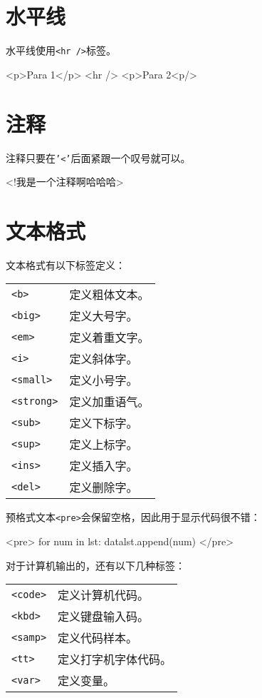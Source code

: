 \documentclass[a4paper,12pt]{report}
\newcommand{\httag}[1]{\texttt{<#1>\index{<#1>}}}
\begin{document}
\section{水平线}
水平线使用\httag{hr /}标签。
\begin{myht}
<p>Para 1</p>
<hr />
<p>Para 2<p/>
\end{myht}

\section{注释}
注释只要在\texttt{'<'}后面紧跟一个叹号就可以。
\begin{myht}
<!我是一个注释啊哈哈哈>
\end{myht}

\section{文本格式}
文本格式有以下标签定义：

\begin{center}
\begin{tabular}{ll}
\httag{b} &	定义粗体文本。\\
\httag{big} & 定义大号字。\\
\httag{em} & 定义着重文字。\\
\httag{i} &	定义斜体字。 \\
\httag{small} & 定义小号字。 \\
\httag{strong} & 定义加重语气。 \\
\httag{sub} & 定义下标字。 \\
\httag{sup} & 定义上标字。 \\
\httag{ins} & 定义插入字。 \\
\httag{del} & 定义删除字。
\end{tabular}
\end{center}

预格式文本\httag{pre}会保留空格，因此用于显示代码很不错：
\begin{myht}
<pre>
for num in lst:
    datalst.append(num)
</pre>
\end{myht}

对于计算机输出的，还有以下几种标签：
\begin{center}
\begin{tabular}{ll}
\httag{code} & 定义计算机代码。\\
\httag{kbd} & 定义键盘输入码。\\
\httag{samp} & 定义代码样本。\\
\httag{tt} & 定义打字机字体代码。 \\
\httag{var} & 定义变量。
\end{tabular}
\end{center}
\end{document}
